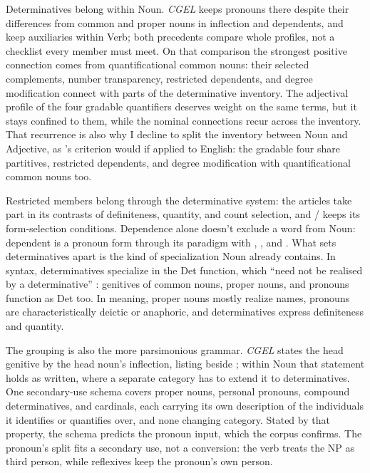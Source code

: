 \documentclass[12pt]{article}
\begin{document}
Determinatives belong within Noun. \textit{CGEL} keeps pronouns there despite their differences from common and proper nouns in inflection and dependents, and \textcite{pullumwilson1977} keep auxiliaries within Verb; both precedents compare whole profiles, not a checklist every member must meet. On that comparison the strongest positive connection comes from quantificational common nouns: their selected complements, number transparency, restricted dependents, and degree modification connect with parts of the determinative inventory. The adjectival profile of the four gradable quantifiers deserves weight on the same terms, but it stays confined to them, while the nominal connections recur across the inventory. That recurrence is also why I decline to split the inventory between Noun and Adjective, as \textcite{vaneynde2003determiner}'s criterion would if applied to English: the gradable four share partitives, restricted dependents, and degree modification with quantificational common nouns too.

Restricted members belong through the determinative system: the articles take part in its contrasts of definiteness, quantity, and count selection, and / keeps its form-selection conditions. Dependence alone doesn't exclude a word from Noun: dependent  is a pronoun form through its paradigm with , , and . What sets determinatives apart is the kind of specialization Noun already contains. In syntax, determinatives specialize in the Det function, which \enquote{need not be realised by a determinative} \citep[358]{huddleston2002}: genitives of common nouns, proper nouns, and pronouns function as Det too. In meaning, proper nouns mostly realize names, pronouns are characteristically deictic or anaphoric, and determinatives express definiteness and quantity.

The grouping is also the more parsimonious grammar. \textit{CGEL} states the head genitive by the head noun's inflection, listing  beside ; within Noun that statement holds as written, where a separate category has to extend it to determinatives.
One secondary-use schema covers proper nouns, personal pronouns, compound determinatives, and cardinals, each carrying its own description of the individuals it identifies or quantifies over, and none changing category. Stated by that property, the schema predicts the pronoun input, which the corpus confirms. The pronoun's split fits a secondary use, not a conversion: the verb treats the NP as third person, while reflexives keep the pronoun's own person.
\end{document}
